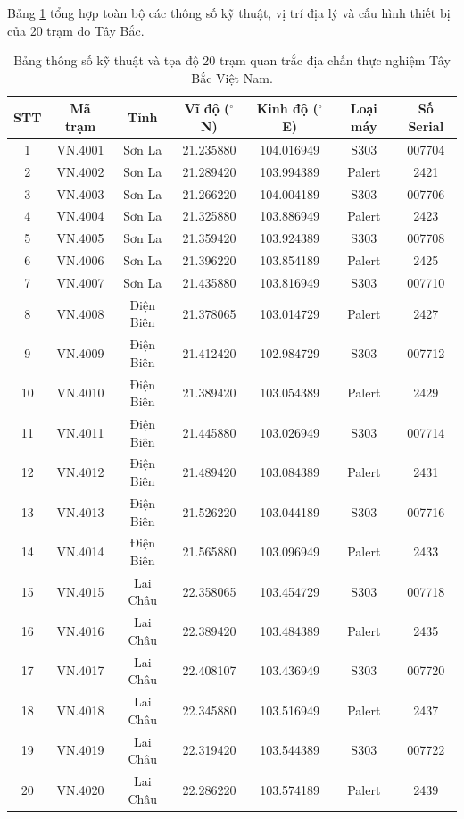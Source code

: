 \documentclass[preprint,1p]{elsarticle}
\begin{document}
Bảng \ref{tab:stations_detail} tổng hợp toàn bộ các thông số kỹ thuật, vị trí địa lý và cấu hình thiết bị của 20 trạm đo Tây Bắc.

\begin{table}[htbp]
\centering
\small
\caption{Bảng thông số kỹ thuật và tọa độ 20 trạm quan trắc địa chấn thực nghiệm Tây Bắc Việt Nam.}
\label{tab:stations_detail}
\begin{tabular}{ccccccc}
\toprule
\textbf{STT} & \textbf{Mã trạm} & \textbf{Tỉnh} & \textbf{Vĩ độ ($^\circ$N)} & \textbf{Kinh độ ($^\circ$E)} & \textbf{Loại máy} & \textbf{Số Serial} \\
\midrule
1 & VN.4001 & Sơn La & 21.235880 & 104.016949 & S303 & 007704 \\
2 & VN.4002 & Sơn La & 21.289420 & 103.994389 & Palert & 2421 \\
3 & VN.4003 & Sơn La & 21.266220 & 104.004189 & S303 & 007706 \\
4 & VN.4004 & Sơn La & 21.325880 & 103.886949 & Palert & 2423 \\
5 & VN.4005 & Sơn La & 21.359420 & 103.924389 & S303 & 007708 \\
6 & VN.4006 & Sơn La & 21.396220 & 103.854189 & Palert & 2425 \\
7 & VN.4007 & Sơn La & 21.435880 & 103.816949 & S303 & 007710 \\
8 & VN.4008 & Điện Biên & 21.378065 & 103.014729 & Palert & 2427 \\
9 & VN.4009 & Điện Biên & 21.412420 & 102.984729 & S303 & 007712 \\
10 & VN.4010 & Điện Biên & 21.389420 & 103.054389 & Palert & 2429 \\
11 & VN.4011 & Điện Biên & 21.445880 & 103.026949 & S303 & 007714 \\
12 & VN.4012 & Điện Biên & 21.489420 & 103.084389 & Palert & 2431 \\
13 & VN.4013 & Điện Biên & 21.526220 & 103.044189 & S303 & 007716 \\
14 & VN.4014 & Điện Biên & 21.565880 & 103.096949 & Palert & 2433 \\
15 & VN.4015 & Lai Châu & 22.358065 & 103.454729 & S303 & 007718 \\
16 & VN.4016 & Lai Châu & 22.389420 & 103.484389 & Palert & 2435 \\
17 & VN.4017 & Lai Châu & 22.408107 & 103.436949 & S303 & 007720 \\
18 & VN.4018 & Lai Châu & 22.345880 & 103.516949 & Palert & 2437 \\
19 & VN.4019 & Lai Châu & 22.319420 & 103.544389 & S303 & 007722 \\
20 & VN.4020 & Lai Châu & 22.286220 & 103.574189 & Palert & 2439 \\
\bottomrule
\end{tabular}
\end{table}
\end{document}
